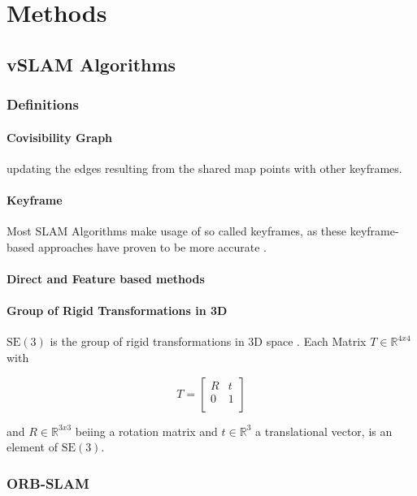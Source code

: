 \chapter{Methods}
\section{vSLAM Algorithms}

	\subsection{Definitions}
	
		\subsubsection{Covisibility Graph}
		
		updating the edges resulting from the shared map
		points with other keyframes.
		
		\subsubsection{Keyframe}
		
		Most SLAM Algorithms make usage of so called keyframes, as these keyframe-based approaches have proven to be more accurate \cite{keyframe}. 
		
		\subsubsection{Direct and Feature based methods}
		
		\subsubsection{Group of Rigid Transformations in 3D}
		
		$\text{SE}(3)$ is the group of rigid transformations in 3D space \cite{se3}. Each Matrix $ T \in \mathbb{R}^{4x4}$ with 
		
		$$ T = \left[
		\begin{array}{rrr}
		R &  t \\  
		0  & 1 \\ 
		\end{array} \right]$$
		
		and $ R \in \mathbb{R}^{3x3}$ beiing a rotation matrix and $ t \in \mathbb{R}^{3}$ a translational vector, is an element of $\text{SE}(3)$.
		

	\subsection{ORB-SLAM}
	
